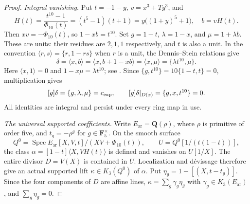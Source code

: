 \begin{proof}
\emph{Integral vanishing.}
Put $t=-1-y$, $v=x^3+Ty^3$, and
\[
 H(t)=\frac{t^{10}-1}{\Phi_{10}(t)}=(t^5-1)(t+1)
      =y\bigl((1+y)^5+1\bigr),\quad b=vH(t).
\]
Then $xv=-\Phi_{10}(t)$, so $1-xb=t^{10}$.
Set $g=1-t$, $\lambda=1-x$, and $\mu=1+\lambda b$.
These are units: their residues are $2,1,1$ respectively, and
$t$ is also a unit. In the convention
$\langle r,s\rangle=\{r,1-rs\}$ when $r$ is a unit, the
Dennis--Stein relations give
\[
 \delta=\langle x,b\rangle
 =\langle x,b+1-xb\rangle=\langle x,\mu\rangle
 =\{\lambda t^{10},\mu\}.
\]
Here $\langle x,1\rangle=0$ and $1-x\mu=\lambda t^{10}$;
see \cite[Chapter~III, Definition~5.11 and relations (D1)--(D3)]{Weibel}.
Since $\{g,t^{10}\}=10\{1-t,t\}=0$, multiplication gives
\begin{equation}\label{d2ext:dimtwoDSidentity}
 [g]\delta=\{g,\lambda,\mu\}=c_{\rm exp},\qquad
 [g]\delta|_{D(x)}=\{g,x,t^{10}\}=0.
\end{equation}
All identities are integral and persist under every ring map in use.

\emph{The universal supported coefficients.}
Write $E_{\mathrm{ar}}=\mathbf Q(\rho)$, where $\rho$ is primitive of order five,
and $t_g=-\rho^g$ for $g\in\mathbf F_5^\times$. On the smooth surface
\[
 Q^0=\operatorname{Spec}E_{\mathrm{ar}}[X,V,t]/(XV+\Phi_{10}(t)),\qquad
 U=Q^0[1/(t(1-t))],
\]
the class $\alpha=[1-t]\langle X,VH(t)\rangle$ is defined and
vanishes on $U[1/X]$. The entire divisor $D=V(X)$ is contained
in $U$. Localization and d\'evissage therefore give an actual
supported lift $\kappa\in K_3(Q^0)$ of $\alpha$.
Put $\eta_g=1-[(X,t-t_g)]$. Since the four components of $D$
are affine lines, $\kappa=\sum_g\gamma_g\eta_g$ with
$\gamma_g\in K_3(E_{\mathrm{ar}})$, and $\sum_g\eta_g=0$.


\end{proof}
